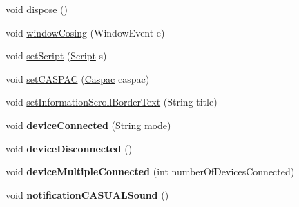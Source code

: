 \begin{DoxyCompactItemize}
void \hyperlink{class_g_u_i_1_1development_1_1_c_a_s_u_a_l_g_u_i_main_a4ca4e8e4ce530ee7f5fbabee0a676990}{dispose} ()
\item 
void \hyperlink{class_g_u_i_1_1development_1_1_c_a_s_u_a_l_g_u_i_main_a2f784081877d55eeeec7de5a58368fd4}{window\-Cosing} (Window\-Event e)
\item 
void \hyperlink{class_g_u_i_1_1development_1_1_c_a_s_u_a_l_g_u_i_main_a386f1de138c72db720e1685c97b482da}{set\-Script} (\hyperlink{class_c_a_s_u_a_l_1_1caspac_1_1_script}{Script} s)
\item 
void \hyperlink{class_g_u_i_1_1development_1_1_c_a_s_u_a_l_g_u_i_main_ab8972d6f2f9c3a49bb77bb63f4cb5377}{set\-C\-A\-S\-P\-A\-C} (\hyperlink{class_c_a_s_u_a_l_1_1caspac_1_1_caspac}{Caspac} caspac)
\item 
void \hyperlink{class_g_u_i_1_1development_1_1_c_a_s_u_a_l_g_u_i_main_acfc62a17991bc1e9abd6868532c26996}{set\-Information\-Scroll\-Border\-Text} (String title)
\item 
\hypertarget{class_g_u_i_1_1development_1_1_c_a_s_u_a_l_g_u_i_main_a33e12f699bc7501eab8c6b7c4a8b216e}{void {\bfseries device\-Connected} (String mode)}\label{class_g_u_i_1_1development_1_1_c_a_s_u_a_l_g_u_i_main_a33e12f699bc7501eab8c6b7c4a8b216e}

\item 
\hypertarget{class_g_u_i_1_1development_1_1_c_a_s_u_a_l_g_u_i_main_abc765ffda03eaac0eec791733f976e70}{void {\bfseries device\-Disconnected} ()}\label{class_g_u_i_1_1development_1_1_c_a_s_u_a_l_g_u_i_main_abc765ffda03eaac0eec791733f976e70}

\item 
\hypertarget{class_g_u_i_1_1development_1_1_c_a_s_u_a_l_g_u_i_main_a83da1674b620a7e018592ff276e29ff9}{void {\bfseries device\-Multiple\-Connected} (int number\-Of\-Devices\-Connected)}\label{class_g_u_i_1_1development_1_1_c_a_s_u_a_l_g_u_i_main_a83da1674b620a7e018592ff276e29ff9}

\item 
\hypertarget{class_g_u_i_1_1development_1_1_c_a_s_u_a_l_g_u_i_main_af728a9ace9c9d442d703cab0e9db2b7f}{void {\bfseries notification\-C\-A\-S\-U\-A\-L\-Sound} ()}\label{class_g_u_i_1_1development_1_1_c_a_s_u_a_l_g_u_i_main_af728a9ace9c9d442d703cab0e9db2b7f}


\end{DoxyCompactItemize}
